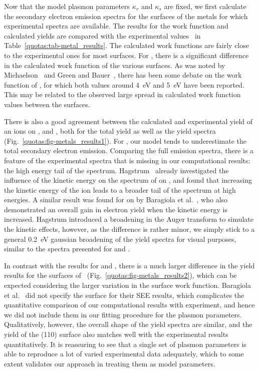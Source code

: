 \begin{refsection}
Now that the model plasmon parameters $\kappa_v$ and $\kappa_s$ are fixed, 
we first calculate the secondary electron emission spectra for the surfaces of 
the metals for which experimental spectra are available. The results for 
the work function and calculated yields are compared with the experimental 
values~\cite{DeWaele2016, Baragiola2001, Hagstrum1966} in 
Table~\ref{quotas:tab-metal_results}. The calculated work functions are fairly 
close to the experimental ones for most surfaces. For , there is a 
significant difference in the calculated work function of the various 
surfaces. As was noted by Michaelson~\cite{Michaelson1977} and Green and 
Bauer~\cite{Green1978}, there has been some debate on the work function of 
, for which both values around 4~\si{\electronvolt} and 5~\si{\electronvolt} have been 
reported. This may be related to the observed large spread in calculated work 
function values between the surfaces. 

There is also a good agreement between the calculated and experimental yield 
of  an  ions on ,  and , both for 
the total yield as well as the yield spectra 
(Fig.~\ref{quotas:fig-metals_results1}). For , our model tends to 
underestimate the total secondary electron emission. Comparing the full 
emission spectra, there is a feature of the experimental spectra that is 
missing in our computational results: the high energy tail of the spectrum. 
Hagstrum~\cite{Hagstrum1960} already investigated the influence of the kinetic 
energy on the spectrum of  on , and found that increasing 
the kinetic energy of the ion leads to a broader tail of the spectrum at high 
energies. A similar result was found for  on  by Baragiola et 
al.~\cite{Baragiola1996}, who also demonstrated an overall gain in electron 
yield when the kinetic energy is increased. Hagstrum introduced a broadening 
in the Auger transform to simulate the kinetic effects, however, as the 
difference is rather minor, we simply stick to a general 
0.2~\si{\electronvolt} gaussian broadening of the yield spectra for visual 
purposes, similar to the spectra presented for  and .

In contrast with the results for  and , there is a much larger 
difference in the yield results for the surfaces of 
~(Fig.~\ref{quotas:fig-metals_results2}), which can be expected 
considering the larger variation in the surface work function. Baragiola et 
al.~\cite{Baragiola2001} did not specify the  surface for their SEE results, which 
complicates the quantitative comparison of our computational results with 
experiment, and hence we did not include them in our fitting procedure for the 
plasmon parameters. Qualitatively, however, the overall shape of the  
yield spectra are similar, and the yield of the (110) surface also matches 
well with the experimental results quantitatively. It is reassuring to see 
that a single set of plasmon parameters is able to reproduce a lot of varied 
experimental data adequately, which to some extent validates our approach in 
treating them as model parameters. 


\end{refsection}
